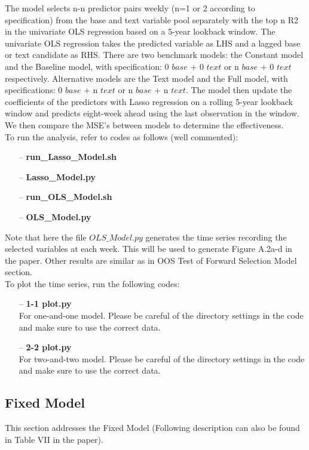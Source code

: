 \documentclass[11pt]{article}
\begin{document}
The model selects n-n predictor pairs weekly (n=1 or 2 according to specification) from the base and text variable pool separately with the top n R2 in the univariate OLS regression based on a 5-year lookback window. The univariate OLS regression takes the predicted variable as LHS and a lagged base or text candidate as RHS. There are two benchmark models: the Constant model and the Baseline model, with specification: 0 $base$ + 0 $text$  or n $base$ + 0 $text$  respectively. Alternative models are the Text model and the Full model, with specifications: 0 $base$ + n $text$  or n $base$ + n $text$. The model then update the coefficients of the predictors with Lasso regression on a rolling 5-year lookback window and predicts eight-week ahead using the last observation in the window. We then compare the MSE's between models to determine the effectiveness.\\

To run the analysis, refer to codes as follows (well commented):
\begin{enumerate}
	\item[--] \textbf{run\_Lasso\_Model.sh}
	\item[--] \textbf{Lasso\_Model.py}
	\item[--] \textbf{run\_OLS\_Model.sh}
	\item[--] \textbf{OLS\_Model.py}
\end{enumerate}

Note that here the file $OLS\_Model.py$ generates the time series recording  the selected variables at each week. This will be used to generate Figure A.2a-d in the paper. Other results are similar as in OOS Test of Forward Selection Model section. \\

To plot the time series, run the following codes:
\begin{enumerate}
	\item[--] \textbf{1-1 plot.py}\\
	For one-and-one model. Please be careful of the directory settings in the code and make sure to use the correct data.
	\item[--] \textbf{2-2 plot.py}\\
	For two-and-two model. Please be careful of the directory settings in the code and make sure to use the correct data.
\end{enumerate}


\subsection{Fixed Model}
This section addresses the Fixed Model (Following description can also be found in Table VII in the paper). \\
\end{document}
